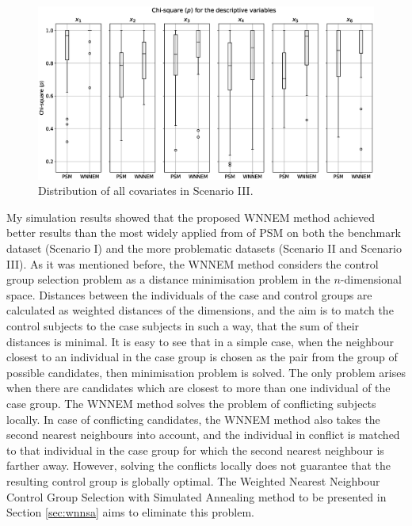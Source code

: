 										
		\begin{figure}[h]
			\centering
			\captionsetup{justification=centering}
			\includegraphics[width=\textwidth]{assets/figures/control_group_selection/wnnem/scenIII/distribution.eps}
			\caption{Distribution of all covariates in Scenario III. %
			}
			\label{fig:wnnem_scen_III_distribution}    
		\end{figure}
		
		\vspace{0.5cm}
		        
		My simulation results showed that the proposed WNNEM method achieved better results than the most widely applied from of PSM on both the benchmark dataset (Scenario I) and the more problematic datasets (Scenario II and Scenario III). As it was mentioned before, the WNNEM method considers the control group selection problem as a distance minimisation problem in the $n$-dimensional space. Distances between the individuals of the case and control groups are calculated as weighted distances of the dimensions, and the aim is to match the control subjects to the case subjects in such a way, that the sum of their distances is minimal. It is easy to see that in a simple case, when the neighbour closest to an individual in the case group is chosen as the pair from the group of possible candidates, then minimisation problem is solved. The only problem arises when there are candidates which are closest to more than one individual of the case group. The WNNEM method solves the problem of conflicting subjects locally. In case of conflicting candidates, the WNNEM method also takes the second nearest neighbours into account, and the individual in conflict is matched to that individual in the case group for which the second nearest neighbour is farther away. However, solving the conflicts locally does not guarantee that the resulting control group is globally optimal. The Weighted Nearest Neighbour Control Group Selection with Simulated Annealing method to be presented in Section \ref{sec:wnnsa} aims to eliminate this problem. 
										

